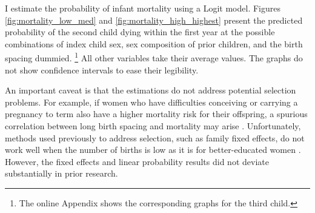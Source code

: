 \documentclass[12pt,letterpaper]{article}
\begin{document}
I estimate the probability of infant mortality using a Logit model.
Figures \ref{fig:mortality_low_med} and \ref{fig:mortality_high_highest} present 
the predicted probability of the second child dying within the first year at the 
possible combinations of index child sex, sex composition of prior children, and 
the birth spacing dummied.%
\footnote{
The online Appendix shows the corresponding graphs for the third child.
}
All other variables take their average values.
The graphs do not show confidence intervals to ease their legibility.

An important caveat is that the estimations do not 
address potential selection problems.
For example, if women who have difficulties conceiving or carrying a pregnancy 
to term also have a higher mortality risk for their offspring, a spurious correlation 
between long birth spacing and mortality may arise \citep{Kozuki2013}. 
Unfortunately, methods used previously to address selection, such
as family fixed effects, do not work well when the number of births is
low as it is for better-educated women \citep{Kozuki2013,Molitoris2019}.
However, the fixed effects and linear probability results did not 
deviate substantially in prior research.
\end{document}
